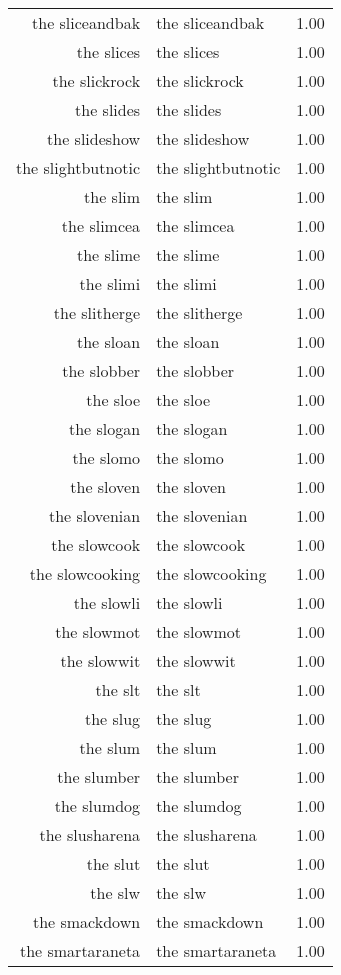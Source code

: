 \begin{table}[ht]
\begin{tabular}{rlr}
  the sliceandbak & the sliceandbak & 1.00 \\ 
  the slices & the slices & 1.00 \\ 
  the slickrock & the slickrock & 1.00 \\ 
  the slides & the slides & 1.00 \\ 
  the slideshow & the slideshow & 1.00 \\ 
  the slightbutnotic & the slightbutnotic & 1.00 \\ 
  the slim & the slim & 1.00 \\ 
  the slimcea & the slimcea & 1.00 \\ 
  the slime & the slime & 1.00 \\ 
  the slimi & the slimi & 1.00 \\ 
  the slitherge & the slitherge & 1.00 \\ 
  the sloan & the sloan & 1.00 \\ 
  the slobber & the slobber & 1.00 \\ 
  the sloe & the sloe & 1.00 \\ 
  the slogan & the slogan & 1.00 \\ 
  the slomo & the slomo & 1.00 \\ 
  the sloven & the sloven & 1.00 \\ 
  the slovenian & the slovenian & 1.00 \\ 
  the slowcook & the slowcook & 1.00 \\ 
  the slowcooking & the slowcooking & 1.00 \\ 
  the slowli & the slowli & 1.00 \\ 
  the slowmot & the slowmot & 1.00 \\ 
  the slowwit & the slowwit & 1.00 \\ 
  the slt & the slt & 1.00 \\ 
  the slug & the slug & 1.00 \\ 
  the slum & the slum & 1.00 \\ 
  the slumber & the slumber & 1.00 \\ 
  the slumdog & the slumdog & 1.00 \\ 
  the slusharena & the slusharena & 1.00 \\ 
  the slut & the slut & 1.00 \\ 
  the slw & the slw & 1.00 \\ 
  the smackdown & the smackdown & 1.00 \\ 
  the smartaraneta & the smartaraneta & 1.00 \\ 

\end{tabular}
\end{table}

